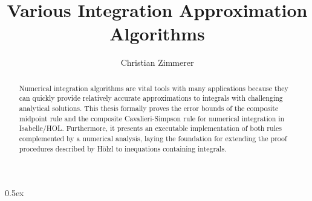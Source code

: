 \documentclass[11pt,a4paper]{article}
\begin{document}
\title{Various Integration Approximation Algorithms}
\author{Christian Zimmerer}
\maketitle

\begin{abstract}
Numerical integration algorithms are vital tools with many applications because they can quickly provide relatively accurate approximations to integrals with challenging analytical solutions. This thesis formally proves the error bounds of the composite midpoint rule and the composite Cavalieri-Simpson rule for numerical integration in Isabelle/HOL. Furthermore, it presents an executable implementation of both rules complemented by a numerical analysis, laying the foundation for extending the proof procedures described by Hölzl \cite{hoelzl09} to inequations containing integrals.
\end{abstract}

\newpage

\tableofcontents

\newpage

\parindent 0pt\parskip 0.5ex






\end{document}
